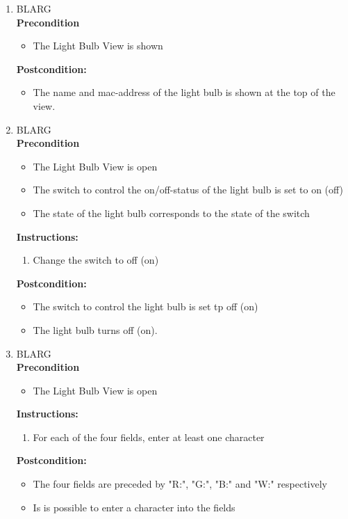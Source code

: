 \documentclass[a4paper]{article}
\newlength{\testlabellength}
\newenvironment{testlist}{\begin{enumerate}[label=\bfseries Instruction \thesubsection.\arabic* , labelindent=0pt, labelwidth=\testlabellength , leftmargin=2cm]}{\end{enumerate}}
\newenvironment{precondition}{
{\color{white}BLARG}\\ 
\textbf{Precondition}
\begin{itemize}[labelindent=0cm, labelwidth=2cm , leftmargin=1cm]
}
{\end{itemize}}
\newenvironment{instruction}{
\textbf{Instructions:}
\begin{enumerate}[label=\bfseries  \arabic*., labelindent=0cm, labelwidth=2cm , leftmargin=1cm]
}
{\end{enumerate}}
\newenvironment{postcondition}{
\textbf{Postcondition:}
\begin{itemize}[labelindent=0cm, labelwidth=2cm , leftmargin=1cm]
}
{\end{itemize}}
\begin{document}
\begin{appendices}
\begin{testlist}
	
	\item 	\begin{precondition}
				\item The Light Bulb View is shown
			\end{precondition}
    		\begin{postcondition}
    			\item The name and mac-address of the light bulb is shown at the top of the view.
    		\end{postcondition}
    	
	
	\item 	\begin{precondition}
				\item The Light Bulb View is open
				\item The switch to control the on/off-status of the light bulb is set to on (off)
				\item The state of the light bulb corresponds to the state of the switch
			\end{precondition}
    		\begin{instruction}
    			\item Change the switch to off (on)
    		\end{instruction}
    		\begin{postcondition}
    			\item The switch to control the light bulb is set tp off (on)
    			\item The light bulb turns off (on).
    		\end{postcondition}
    		
  
    
   	\item 	\begin{precondition}
   				\item The Light Bulb View is open
			\end{precondition}
    		\begin{instruction}
    			\item For each of the four fields, enter at least one character
    		\end{instruction}
    		\begin{postcondition}
    			\item The four fields are preceded by "R:", "G:", "B:" and "W:" respectively
    			\item Is is possible to enter a character into the fields
    		\end{postcondition}


\end{testlist}
\end{appendices}
\end{document}
